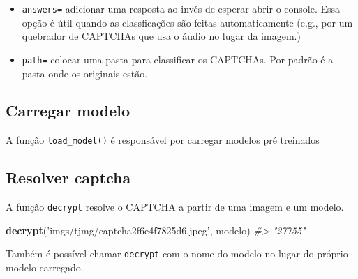 \documentclass[12pt,]{report}
\newenvironment{Shaded}{\begin{snugshade}}{\end{snugshade}}
\newcommand{\KeywordTok}[1]{\textcolor[rgb]{0.13,0.29,0.53}{\textbf{#1}}}
\newcommand{\StringTok}[1]{\textcolor[rgb]{0.31,0.60,0.02}{#1}}
\newcommand{\CommentTok}[1]{\textcolor[rgb]{0.56,0.35,0.01}{\textit{#1}}}
\newcommand{\OperatorTok}[1]{\textcolor[rgb]{0.81,0.36,0.00}{\textbf{#1}}}
\newcommand{\NormalTok}[1]{#1}
\providecommand{\tightlist}{%
  \setlength{\itemsep}{0pt}\setlength{\parskip}{0pt}}
\begin{document}
\begin{itemize}
\tightlist
\item
  \texttt{answers=} adicionar uma resposta ao invés de esperar abrir o
  console. Essa opção é útil quando as classficações são feitas
  automaticamente (e.g., por um quebrador de CAPTCHAs que usa o áudio no
  lugar da imagem.)
\item
  \texttt{path=} colocar uma pasta para classificar os CAPTCHAs. Por
  padrão é a pasta onde os originais estão.
\end{itemize}

\subsection{Carregar modelo}\label{carregar-modelo}

A função \texttt{load\_model()} é responsável por carregar modelos pré
treinados

\begin{Shaded}
\end{Shaded}

\subsection{Resolver captcha}\label{resolver-captcha}

A função \texttt{decrypt} resolve o CAPTCHA a partir de uma imagem e um
modelo.

\begin{Shaded}
\begin{Highlighting}[]
\KeywordTok{decrypt}\NormalTok{(}\StringTok{'imgs/tjmg/captcha2f6e4f7825d6.jpeg'}\NormalTok{, modelo)}
\CommentTok{#> "27755"}
\end{Highlighting}
\end{Shaded}

Também é possível chamar \texttt{decrypt} com o nome do modelo no lugar
do próprio modelo carregado.


\end{document}
